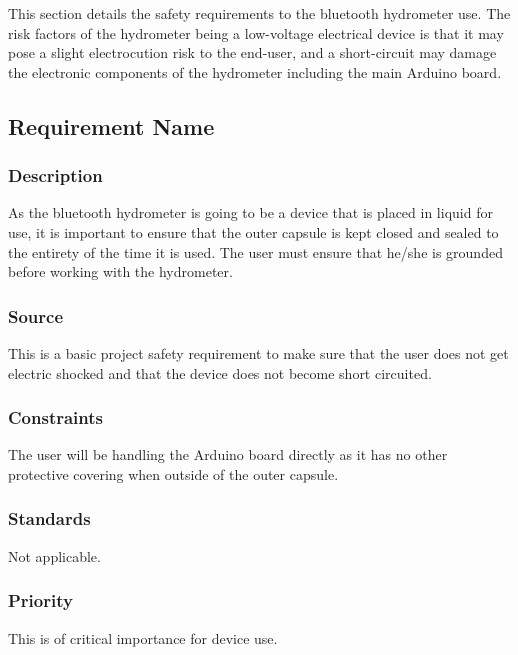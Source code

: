 This section details the safety requirements to the bluetooth hydrometer use. The risk factors of the hydrometer being a low-voltage electrical device is that it may pose a slight electrocution risk to the end-user, and a short-circuit may damage the electronic components of the hydrometer including the main Arduino board.

\subsection{Requirement Name}
\subsubsection{Description}
As the bluetooth hydrometer is going to be a device that is placed in liquid for use, it is important to ensure that the outer capsule is kept closed and sealed to the entirety of the time it is used. The user must ensure that he/she is grounded before working with the hydrometer.
\subsubsection{Source}
This is a basic project safety requirement to make sure that the user does not get electric shocked and that the device does not become short circuited.
\subsubsection{Constraints}
The user will be handling the Arduino board directly as it has no other protective covering when outside of the outer capsule.
\subsubsection{Standards}
Not applicable.
\subsubsection{Priority}
This is of critical importance for device use.